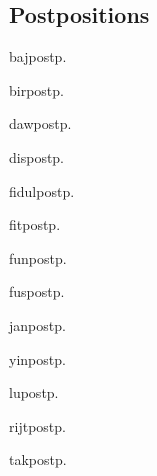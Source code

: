 \begin{multicols*}{2}
\section{Postpositions}

\begin{description}[leftmargin=*,labelwidth=*]
    \begin{dictentry}{baj}{postp.}
    \end{dictentry}
    \begin{dictentry}{bir}{postp.}
    \end{dictentry}
    \begin{dictentry}{daw}{postp.}
    \end{dictentry}
    \begin{dictentry}{dis}{postp.}
    \end{dictentry}
    \begin{dictentry}{fidul}{postp.}
    \end{dictentry}
    \begin{dictentry}{fit}{postp.}
    \end{dictentry}
    \begin{dictentry}{fun}{postp.}
    \end{dictentry}
    \begin{dictentry}{fus}{postp.}
    \end{dictentry}
    \begin{dictentry}{jan}{postp.}
    \end{dictentry}
    \begin{dictentry}{yin}{postp.}
    \end{dictentry}
    \begin{dictentry}{lu}{postp.}
    \end{dictentry}
    \begin{dictentry}{rijt}{postp.}
    \end{dictentry}
    \begin{dictentry}{tak}{postp.}

\end{dictentry}
\end{description}
\end{multicols*}
